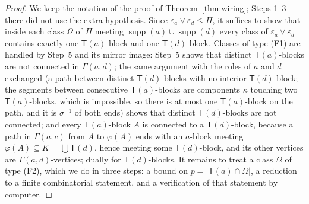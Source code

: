 \documentclass[11pt]{amsart}
\theoremstyle{definition}
\newcommand{\supp}{\operatorname{supp}}
\newcommand{\T}{\mathsf{T}}
\begin{document}
\begin{proof}
We keep the notation of the proof of Theorem~\ref{thm:wiring}; Steps 1--3 there did not use the extra hypothesis. Since $\varepsilon_a\vee\varepsilon_d\le\Pi$, it suffices to show that inside each class $\Omega$ of $\Pi$ meeting $\supp(a)\cup\supp(d)$ every class of $\varepsilon_a\vee\varepsilon_d$ contains exactly one $\T(a)$-block and one $\T(d)$-block. Classes of type (F1) are handled by Step~5 and its mirror image: Step~5 shows that distinct $\T(a)$-blocks are not connected in $\Gamma(a,d)$; the same argument with the roles of $a$ and $d$ exchanged (a path between distinct $\T(d)$-blocks with no interior $\T(d)$-block; the segments between consecutive $\T(a)$-blocks are components $\kappa$ touching two $\T(a)$-blocks, which is impossible, so there is at most one $\T(a)$-block on the path, and it is $\sigma^{-1}$ of both ends) shows that distinct $\T(d)$-blocks are not connected; and every $\T(a)$-block $A$ is connected to a $\T(d)$-block, because a path in $\Gamma(a,c)$ from $A$ to $\varphi(A)$ ends with an $a$-block meeting $\varphi(A)\subseteq K=\bigcup\T(d)$, hence meeting some $\T(d)$-block, and its other vertices are $\Gamma(a,d)$-vertices; dually for $\T(d)$-blocks. It remains to treat a class $\Omega$ of type (F2), which we do in three steps: a bound on $p=|\T(a)\cap\Omega|$, a reduction to a finite combinatorial statement, and a verification of that statement by computer.


\end{proof}
\end{document}
